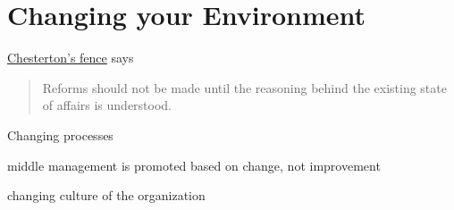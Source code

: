 \section{Changing your Environment}

\href{https://en.wikipedia.org/wiki/Wikipedia:Chesterton\%27s_fence}{Chesterton's fence} says
\begin{quote}
Reforms should not be made until the reasoning behind the existing state of affairs is understood.
\end{quote}


Changing processes

middle management is promoted based on change, not improvement

changing \gls{culture} of the organization
